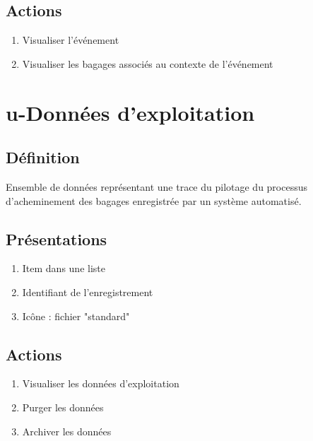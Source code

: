 \subsection{Actions}
\begin{enumerate}
	\item Visualiser l'événement
	\item Visualiser les bagages associés au contexte de l'événement
\end{enumerate}

\section{u-Données d'exploitation}
\subsection{Définition}
	Ensemble de données représentant une trace du pilotage du processus d'acheminement des bagages enregistrée par un
	système automatisé.

\subsection{Présentations}
\begin{enumerate}
	\item Item dans une liste
	\item Identifiant de l'enregistrement
	\item Icône : fichier "standard"
\end{enumerate}

\subsection{Actions}
\begin{enumerate}
	\item Visualiser les données d'exploitation
	\item Purger les données
	\item Archiver les données
\end{enumerate}
